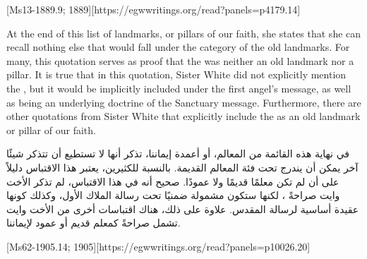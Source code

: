 [Ms13-1889.9; 1889][https://egwwritings.org/read?panels=p4179.14]


At the end of this list of landmarks, or pillars of our faith, she states that she can recall nothing else that would fall under the category of the old landmarks. For many, this quotation serves as proof that the  was neither an old landmark nor a pillar. It is true that in this quotation, Sister White did not explicitly mention the , but it would be implicitly included under the first angel’s message, as well as being an underlying doctrine of the Sanctuary message. Furthermore, there are other quotations from Sister White that explicitly include the  as an old landmark or pillar of our faith.


في نهاية هذه القائمة من المعالم، أو أعمدة إيماننا، تذكر أنها لا تستطيع أن تتذكر شيئًا آخر يمكن أن يندرج تحت فئة المعالم القديمة. بالنسبة للكثيرين، يعتبر هذا الاقتباس دليلاً على أن  لم تكن معلمًا قديمًا ولا عمودًا. صحيح أنه في هذا الاقتباس، لم تذكر الأخت وايت صراحةً ، لكنها ستكون مشمولة ضمنيًا تحت رسالة الملاك الأول، وكذلك كونها عقيدة أساسية لرسالة المقدس. علاوة على ذلك، هناك اقتباسات أخرى من الأخت وايت تشمل صراحةً  كمعلم قديم أو عمود لإيماننا.


[Ms62-1905.14; 1905][https://egwwritings.org/read?panels=p10026.20]


